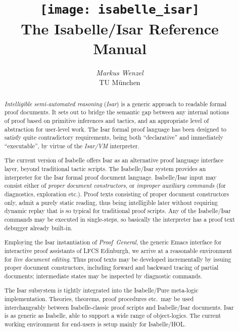 \documentclass[12pt,fleqn]{report}
\title{\texttt{[image: isabelle\_isar]} \\[4ex] The Isabelle/Isar Reference Manual}
\author{\emph{Markus Wenzel} \\ TU M\"unchen}
\begin{document}
\underscoreoff

\maketitle 

\begin{abstract}
  \emph{Intelligible semi-automated reasoning} (\emph{Isar}) is a generic
  approach to readable formal proof documents.  It sets out to bridge the
  semantic gap between any internal notions of proof based on primitive
  inferences and tactics, and an appropriate level of abstraction for
  user-level work.  The Isar formal proof language has been designed to
  satisfy quite contradictory requirements, being both ``declarative'' and
  immediately ``executable'', by virtue of the \emph{Isar/VM} interpreter.
  
  The current version of Isabelle offers Isar as an alternative proof language
  interface layer, beyond traditional tactic scripts.  The Isabelle/Isar
  system provides an interpreter for the Isar formal proof document language.
  Isabelle/Isar input may consist either of \emph{proper document
    constructors}, or \emph{improper auxiliary commands} (for diagnostics,
  exploration etc.).  Proof texts consisting of proper document constructors
  only, admit a purely static reading, thus being intelligible later without
  requiring dynamic replay that is so typical for traditional proof scripts.
  Any of the Isabelle/Isar commands may be executed in single-steps, so
  basically the interpreter has a proof text debugger already built-in.
  
  Employing the Isar instantiation of \emph{Proof~General}, the generic Emacs
  interface for interactive proof assistants of LFCS Edinburgh, we arrive at a
  reasonable environment for \emph{live document editing}.  Thus proof texts
  may be developed incrementally by issuing proper document constructors,
  including forward and backward tracing of partial documents; intermediate
  states may be inspected by diagnostic commands.
  
  The Isar subsystem is tightly integrated into the Isabelle/Pure meta-logic
  implementation.  Theories, theorems, proof procedures etc.\ may be used
  interchangeably between Isabelle-classic proof scripts and Isabelle/Isar
  documents.  Isar is as generic as Isabelle, able to support a wide range of
  object-logics.  The current working environment for end-users is setup
  mainly for Isabelle/HOL.
\end{abstract}

 \tableofcontents \clearfirst

\nocite{Rudnicki:1992:MizarOverview}
\nocite{Harrison:1996:MizarHOL}
\nocite{Rudnicki:1992:MizarOverview}
\nocite{Trybulec:1993:MizarFeatures}
\nocite{Syme:1997:DECLARE}
\nocite{Syme:1998:thesis}
\nocite{Syme:1999:TPHOL}








\begingroup
   \small\raggedright\frenchspacing
  
\endgroup


\end{document}
